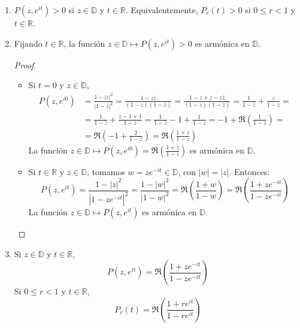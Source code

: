 \begin{properties}
    \hfill
    \begin{enumerate}
        \item $P(z, e^{it}) > 0$ si $z \in \mathbb{D}$ y $t \in \mathbb{R}$.
              Equivalentemente, $P_r(t) > 0$ si $0 \leq r < 1$ y $t \in \mathbb{R}$.

        \item Fijando $t \in \mathbb{R}$, la función $z \in \mathbb{D} \mapsto P(z, e^{it}) > 0$ es armónica en $\mathbb{D}$.
              \begin{proof}
                  \hfill
                  \begin{itemize}
                      \item Si $t = 0$ y $z \in \mathbb{D}$,
                            \begin{align*}
                                P(z, e^{i0}) & = \frac{1-|z|^2}{|1-z|^2} = \frac{1-z\bar{z}}{(1-z)(1-\bar{z})} = \frac{1-z+z-z\bar{z}}{(1-z)(1-\bar{z})} = \frac{1}{1-\bar{z}} + \frac{z}{1-z} = \\
                                             & = \frac{1}{1-\bar{z}} + \frac{z-1+1}{1-z} = \frac{1}{1-\bar{z}} - 1 + \frac{1}{1-z} = -1 + \Re\left(\frac{1}{1-z}\right) =                        \\
                                             & = \Re\left(-1 + \frac{2}{1-z}\right) = \Re\left(\frac{1+z}{1-z}\right)
                            \end{align*}
                            La función $z \in \mathbb{D} \mapsto P(z, e^{i0}) = \Re\left(\frac{1+z}{1-z}\right)$ es armónica en $\mathbb{D}$.

                      \item Si $t \in \mathbb{R}$ y $z \in \mathbb{D}$, tomamos $w = ze^{-it} \in \mathbb{D}$, con $|w| = |z|$.
                            Entonces:
                            $$P(z, e^{it}) = \frac{1-|z|^2}{|1-ze^{-it}|^2} = \frac{1-|w|^2}{|1-w|^2} = \Re\left(\frac{1+w}{1-w}\right) = \Re\left(\frac{1+ze^{-it}}{1-ze^{-it}}\right)$$
                            La función $z \in \mathbb{D} \mapsto P(z, e^{it})$ es armónica en $\mathbb{D}$.
                  \end{itemize}
              \end{proof}

        \item Si $z \in \mathbb{D}$ y $t \in \mathbb{R}$,
              $$P(z, e^{it}) = \Re\left(\frac{1+ze^{-it}}{1-ze^{-it}}\right)$$
              Si $0 \leq r < 1$ y $t \in \mathbb{R}$,
              $$P_r(t) = \Re\left(\frac{1+re^{it}}{1-re^{it}}\right)$$


\end{enumerate}
\end{properties}
